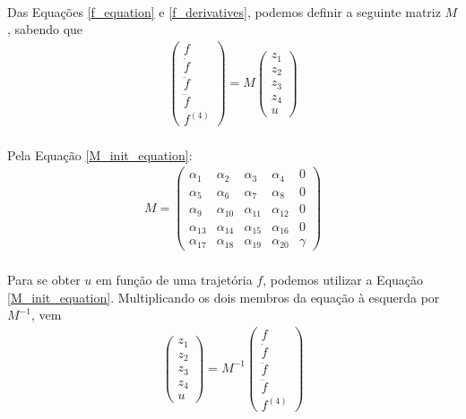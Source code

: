 \documentclass[a4paper,11pt]{scrartcl} %
\numberwithin{equation}{section} %
\numberwithin{figure}{section} %
\numberwithin{table}{section} %
\begin{document}
\paragraph{}Das Equações \ref{f_equation} e \ref{f_derivatives}, podemos definir a seguinte matriz $M$, sabendo que
\begin{align}
\label{M_init_equation}
\left (
\begin{array}{c}
f \\ \dot{f} \\ \ddot{f} \\ \dddot{f} \\ f^{(4)}
\end{array}
\right ) = M \left(
\begin{array}{c}
z_1 \\ z_2 \\ z_3 \\ z_4 \\ u
\end{array}
\right)
\end{align}
\paragraph{}Pela Equação \ref{M_init_equation}:
\begin{align}
\label{M_decl_ref}
M = \left (
\begin{array}{ccccc}
	\alpha_{1} & \alpha_{2} & \alpha_{3} & \alpha_{4} & 0 \\
	\alpha_{5} & \alpha_{6} & \alpha_{7} & \alpha_{8} & 0 \\
	\alpha_{9} & \alpha_{10} & \alpha_{11} & \alpha_{12} & 0 \\
	\alpha_{13} & \alpha_{14} & \alpha_{15} & \alpha_{16} & 0 \\
	\alpha_{17} & \alpha_{18} & \alpha_{19} & \alpha_{20} & \gamma
\end{array}
\right )
\end{align}
\paragraph{}Para se obter $u$ em função de uma trajetória $f$, podemos utilizar a Equação \ref{M_init_equation}. Multiplicando os dois membros da equação à esquerda por $M^{-1}$, vem
\begin{align}
\label{M_inv_equation}
\left(
\begin{array}{c}
z_1 \\ z_2 \\ z_3 \\ z_4 \\ u
\end{array}
\right) = M^{-1}\left (
\begin{array}{c}
f \\ \dot{f} \\ \ddot{f} \\ \dddot{f} \\ f^{(4)}
\end{array}
\right ) 
\end{align} 
\end{document}
